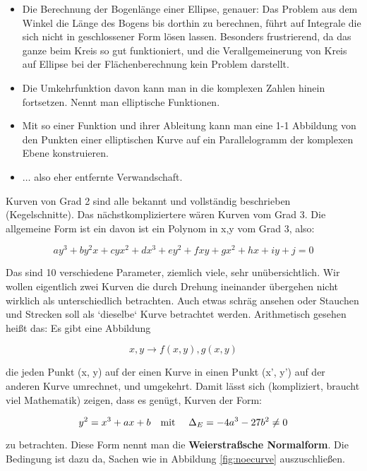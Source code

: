 \documentclass{article}
\newcounter{thm}
\begin{document}
\begin{itemize}
\item
  Die Berechnung der Bogenlänge einer Ellipse, genauer: Das Problem aus dem
  Winkel die Länge des Bogens bis dorthin zu berechnen, führt auf Integrale
  die sich nicht in geschlossener Form lösen lassen. Besonders frustrierend,
  da das ganze beim Kreis so gut funktioniert, und die Verallgemeinerung von
  Kreis auf Ellipse bei der Flächenberechnung kein Problem darstellt.
\item
  Die Umkehrfunktion davon kann man in die komplexen Zahlen hinein
  fortsetzen. Nennt man elliptische Funktionen.
\item
  Mit so einer Funktion und ihrer Ableitung kann man eine 1-1 Abbildung
  von den Punkten einer elliptischen Kurve auf ein Parallelogramm der
  komplexen Ebene konstruieren.
\item
  $\ldots$ also eher entfernte Verwandschaft.
\end{itemize}

Kurven von Grad 2 sind alle bekannt und vollständig beschrieben
(Kegelschnitte). Das nächstkompliziertere wären Kurven vom Grad 3.
Die allgemeine Form ist ein davon ist ein Polynom in x,y vom Grad 3,
also:

\begin{equation*}
  a y^3 + b y^2 x + c y x^2 + d x^3 + e y^2 + f x y + g x^2
  + h x + i y + j = 0
\end{equation*}

Das sind 10 verschiedene Parameter, ziemlich viele, sehr
unübersichtlich. Wir wollen eigentlich zwei Kurven die durch Drehung
ineinander übergehen nicht wirklich als unterschiedlich betrachten. Auch etwas
schräg ansehen oder Stauchen und Strecken soll als `dieselbe` Kurve betrachtet
werden. Arithmetisch gesehen heißt das: Es gibt eine Abbildung

\begin{equation*}
  x, y \rightarrow f(x, y), g(x, y)
\end{equation*}

die jeden Punkt (x, y) auf der einen Kurve in einen Punkt (x', y') auf der
anderen Kurve umrechnet, und umgekehrt. Damit lässt sich (kompliziert, braucht
viel Mathematik) zeigen, dass es genügt, Kurven der Form:

$$ y^2 = x^3 + ax + b \text{\quad mit \quad } \Delta_E = -4a^3 - 27b^2 \ne 0 $$

zu betrachten. Diese Form nennt man die \textbf{Weierstraßsche Normalform}.
Die Bedingung ist dazu da, Sachen wie in Abbildung \ref{fig:noecurve}
auszuschließen.
\end{document}
